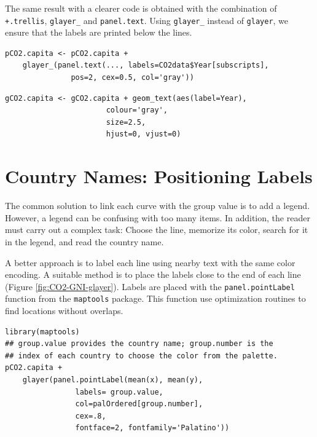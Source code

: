 The same result with a clearer code is obtained with the combination
of \texttt{+.trellis}, \texttt{glayer\_} and \texttt{panel.text}. Using \texttt{glayer\_} instead of
\texttt{glayer}, we ensure that the labels are printed below the lines.


\lstset{language=R,numbers=none}
\begin{lstlisting}
pCO2.capita <- pCO2.capita +
    glayer_(panel.text(..., labels=CO2data$Year[subscripts],
		       pos=2, cex=0.5, col='gray'))
\end{lstlisting}

\lstset{language=R,numbers=none}
\begin{lstlisting}
gCO2.capita <- gCO2.capita + geom_text(aes(label=Year),
				       colour='gray',
				       size=2.5,
				       hjust=0, vjust=0)
\end{lstlisting}
\section{Country Names: Positioning Labels}
\label{sec-4}
The common solution to link each curve with the group value is to add
a legend. However, a legend can be confusing with too many items. In
addition, the reader must carry out a complex task: Choose the line,
memorize its color, search for it in the legend, and read the country
name.

A better approach is to label each line using nearby text with the
same color encoding. A suitable method is to place the labels
close to the end of each line (Figure
\ref{fig:CO2-GNI-glayer}). Labels are placed with the
\texttt{panel.pointLabel} function from the \texttt{maptools} package. This
function use optimization routines to find locations without
overlaps.


\lstset{language=R,numbers=none}
\begin{lstlisting}
library(maptools)  
## group.value provides the country name; group.number is the
## index of each country to choose the color from the palette.
pCO2.capita +
    glayer(panel.pointLabel(mean(x), mean(y),
			    labels= group.value,
			    col=palOrdered[group.number],
			    cex=.8,
			    fontface=2, fontfamily='Palatino'))
\end{lstlisting}

